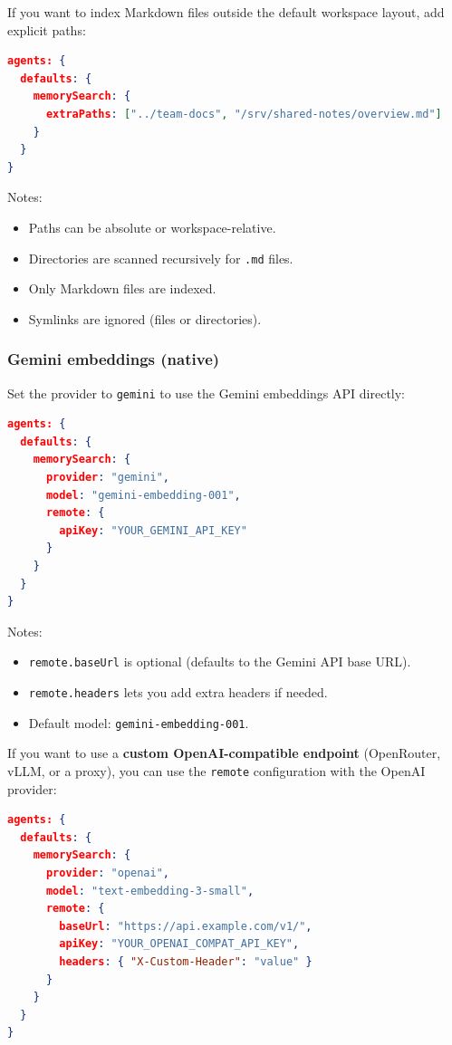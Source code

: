 If you want to index Markdown files outside the default workspace layout, add
explicit paths:

\begin{lstlisting}[language=json]
agents: {
  defaults: {
    memorySearch: {
      extraPaths: ["../team-docs", "/srv/shared-notes/overview.md"]
    }
  }
}
\end{lstlisting}


Notes:

\begin{itemize}
  \item Paths can be absolute or workspace-relative.
  \item Directories are scanned recursively for \texttt{.md} files.
  \item Only Markdown files are indexed.
  \item Symlinks are ignored (files or directories).
\end{itemize}


\subsubsection{Gemini embeddings (native)}


Set the provider to \texttt{gemini} to use the Gemini embeddings API directly:

\begin{lstlisting}[language=json]
agents: {
  defaults: {
    memorySearch: {
      provider: "gemini",
      model: "gemini-embedding-001",
      remote: {
        apiKey: "YOUR_GEMINI_API_KEY"
      }
    }
  }
}
\end{lstlisting}


Notes:

\begin{itemize}
  \item \texttt{remote.baseUrl} is optional (defaults to the Gemini API base URL).
  \item \texttt{remote.headers} lets you add extra headers if needed.
  \item Default model: \texttt{gemini-embedding-001}.
\end{itemize}


If you want to use a \textbf{custom OpenAI-compatible endpoint} (OpenRouter, vLLM, or a proxy),
you can use the \texttt{remote} configuration with the OpenAI provider:

\begin{lstlisting}[language=json]
agents: {
  defaults: {
    memorySearch: {
      provider: "openai",
      model: "text-embedding-3-small",
      remote: {
        baseUrl: "https://api.example.com/v1/",
        apiKey: "YOUR_OPENAI_COMPAT_API_KEY",
        headers: { "X-Custom-Header": "value" }
      }
    }
  }
}
\end{lstlisting}


